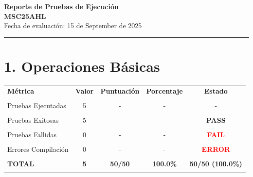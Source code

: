 \documentclass[11pt]{article}
\begin{document}
\begin{center}
\Large\textbf{\color{headerblue}Reporte de Pruebas de Ejecución}\\[0.5cm]
\large\textbf{MSC25AHL}\\[0.3cm]
\normalsize Fecha de evaluación: 15 de September de 2025
\end{center}

\vspace{0.5cm}
\hrule
\vspace{0.5cm}


\vspace{0.5cm}
\section*{\textbf{1.} Operaciones Básicas}


\begin{table}[h!]
\centering
\begin{tabular}{l|c|c|c|c}
\hline
\rowcolor{lightgray}
\textbf{Métrica} & \textbf{Valor} & \textbf{Puntuación} & \textbf{Porcentaje} & \textbf{Estado} \\\\
\hline
Pruebas Ejecutadas & 5 & - & - & - \\\\
Pruebas Exitosas & 5 & - & - & \textcolor{commentgreen}{\textbf{PASS}} \\\\
Pruebas Fallidas & 0 & - & - & \textcolor{red}{\textbf{FAIL}} \\\\
Errores Compilación & 0 & - & - & \textcolor{red}{\textbf{ERROR}} \\\\
\hline
\rowcolor{lightgray}
\textbf{TOTAL} & \textbf{5} & \textbf{50/50} & \textbf{100.0\%} & \textcolor{commentgreen}{\textbf{50/50 (100.0\%)}} \\\\
\hline
\end{tabular}
\end{table}
\end{document}
